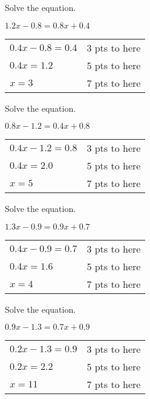 {
	Solve the equation.
	
	$1.2x - 0.8 = 0.8x + 0.4$
}
{
	\begin{tabular}{l r}
	$0.4x-0.8=0.4$ & 3 pts to here\\
	$0.4x=1.2$ & 5 pts to here\\
	$x=3$ & 7 pts to here
	\end{tabular}
}

{
	Solve the equation.
	
	$0.8x - 1.2 = 0.4x + 0.8$
}
{
	\begin{tabular}{l r}
	$0.4x-1.2=0.8$ & 3 pts to here\\
	$0.4x=2.0$ & 5 pts to here\\
	$x=5$ & 7 pts to here
	\end{tabular}
}

{
	Solve the equation.
	
	$1.3x - 0.9 = 0.9x + 0.7$
}
{
	\begin{tabular}{l r}
	$0.4x-0.9=0.7$ & 3 pts to here\\
	$0.4x=1.6$ & 5 pts to here\\
	$x=4$ & 7 pts to here
	\end{tabular}
}

{
	Solve the equation.
	
	$0.9x - 1.3 = 0.7x + 0.9$
}
{
	\begin{tabular}{l r}
	$0.2x-1.3=0.9$ & 3 pts to here\\
	$0.2x=2.2$ & 5 pts to here\\
	$x=11$ & 7 pts to here
	\end{tabular}
}

